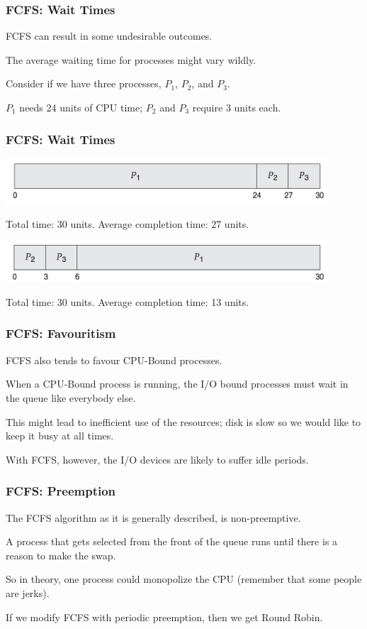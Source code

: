 \begin{frame}
\frametitle{FCFS: Wait Times}

FCFS can result in some undesirable outcomes. 

The average waiting time for processes might vary wildly. 

Consider if we have three processes, $P_{1}$, $P_{2}$, and $P_{3}$. 

$P_{1}$ needs 24 units of CPU time; $P_{2}$ and $P_{3}$ require 3 units each.

\end{frame}

\begin{frame}
\frametitle{FCFS: Wait Times}

\begin{center}
	\includegraphics[width=0.9\textwidth]{images/fcfs-1.png}
\end{center}

Total time: 30 units. Average completion time: 27 units.
\begin{center}
	\includegraphics[width=0.9\textwidth]{images/fcfs-2.png}
\end{center}

Total time: 30 units. Average completion time: 13 units.

\end{frame}

\begin{frame}
\frametitle{FCFS: Favouritism}

FCFS also tends to favour CPU-Bound processes. 

When a CPU-Bound process is running, the I/O bound processes must wait in the queue like everybody else. 

This might lead to inefficient use of the resources; disk is slow so we would like to keep it busy at all times. 

With FCFS, however, the I/O devices are likely to suffer idle periods.

\end{frame}

\begin{frame}
\frametitle{FCFS: Preemption}

The FCFS algorithm as it is generally described, is non-preemptive.

A process that gets selected from the front of the queue runs until there is a reason to make the swap. 

So in theory, one process could monopolize the CPU (remember that some people are jerks). 

If we modify FCFS with periodic preemption, then we get Round Robin.

\end{frame}


